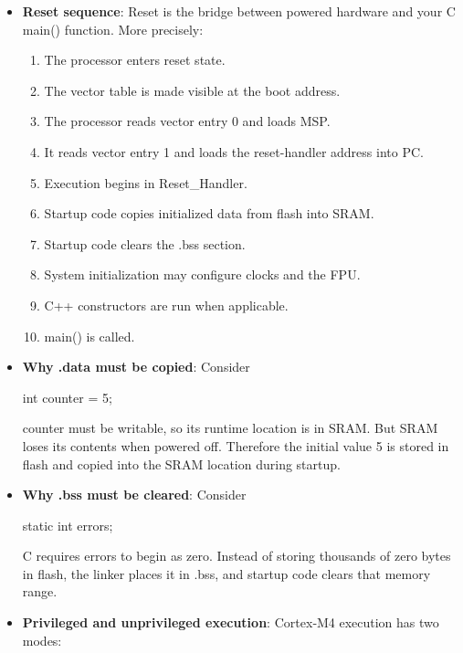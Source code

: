 \documentclass{report}
\begin{document}
\begin{itemize}
        \item \textbf{Reset sequence}: Reset is the bridge between powered hardware and your C main() function.
            \bigbreak \noindent 
            \bigbreak \noindent 
            More precisely:
            \begin{enumerate}
                \item The processor enters reset state.
                \item The vector table is made visible at the boot address.
                \item The processor reads vector entry 0 and loads MSP.
                \item It reads vector entry 1 and loads the reset-handler address into PC.
                \item Execution begins in Reset\_Handler.
                \item Startup code copies initialized data from flash into SRAM.
                \item Startup code clears the .bss section.
                \item System initialization may configure clocks and the FPU.
                \item C++ constructors are run when applicable.
                \item main() is called.
            \end{enumerate}
        \item \textbf{Why .data must be copied}: Consider
            \bigbreak \noindent 
            \begin{ccode}
            int counter = 5;
            \end{ccode}
            \bigbreak \noindent 
            counter must be writable, so its runtime location is in SRAM. But SRAM loses its contents when powered off. Therefore the initial value 5 is stored in flash and copied into the SRAM location during startup.
        \item \textbf{Why .bss must be cleared}: Consider
            \bigbreak \noindent 
            \begin{ccode}
            static int errors;
            \end{ccode}
            \bigbreak \noindent 
            C requires errors to begin as zero. Instead of storing thousands of zero bytes in flash, the linker places it in .bss, and startup code clears that memory range.
        \item \textbf{Privileged and unprivileged execution}: Cortex‑M4 execution has two modes:

\end{itemize}
\end{document}
